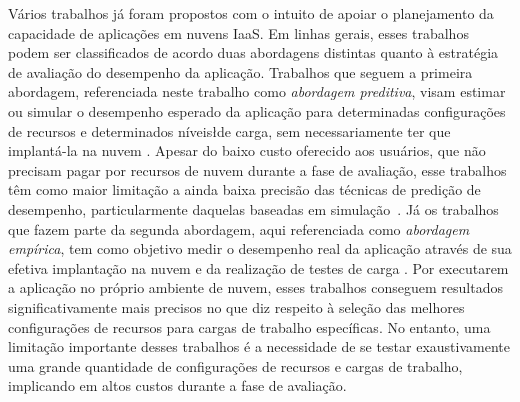 \documentclass[12pt]{article}
\begin{document}
Vários trabalhos já foram propostos com o intuito de apoiar o planejamento da capacidade de aplicações em nuvens IaaS. Em linhas gerais, esses trabalhos podem ser classificados de acordo duas abordagens distintas quanto à estratégia de avaliação do desempenho da aplicação. Trabalhos que seguem a primeira abordagem, referenciada neste trabalho como \emph{abordagem preditiva}, visam estimar ou simular o desempenho esperado da aplicação para determinadas configurações de recursos e determinados níveis\l de carga, sem necessariamente ter que implantá-la na nuvem  \cite{cloudharmony, malkowski2010cloudxplor, fittkau2012cdosim, li2011cloudprophet, jung2013cloudadvisor}. Apesar do baixo custo oferecido aos usuários, que não precisam pagar por recursos de nuvem durante a fase de avaliação, esse trabalhos têm como maior limitação a ainda baixa precisão das técnicas de predição de desempenho, particularmente daquelas baseadas em simulação~\cite{fittkau2012cdosim}. Já os trabalhos que fazem parte da segunda abordagem, aqui referenciada como \emph{abordagem empírica}, tem como objetivo medir o desempenho real da aplicação através de sua efetiva implantação na nuvem e da realização de testes de carga \cite{jayasinghe2012, silva2013cloudbench, cunha2013b, scheuner2014cloud}. Por executarem a aplicação no próprio ambiente de nuvem, esses trabalhos conseguem resultados significativamente mais precisos no que diz respeito à seleção das melhores configurações de recursos para cargas de trabalho específicas. No entanto, uma limitação importante desses trabalhos é a necessidade de se testar exaustivamente uma grande quantidade de configurações de recursos e cargas de trabalho, implicando em altos custos durante a fase de avaliação. 

\end{document}
